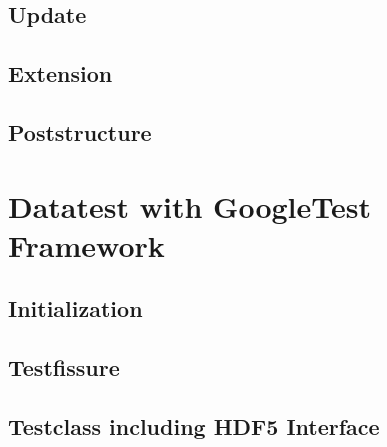 \documentclass{article}
\begin{document}
\subsection{Update}

\subsection{Extension}

\subsection{Poststructure}



\section{Datatest with GoogleTest Framework}
\subsection{Initialization}
\subsection{Testfissure}
\subsection{Testclass including HDF5 Interface}






\end{document}
